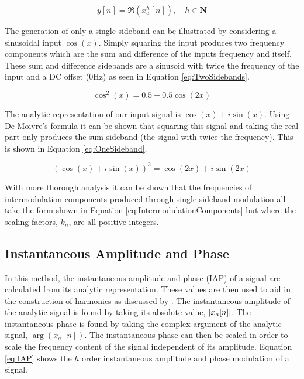 		\begin{equation}
			y[n] = \Re \left( x_{a}^{h}[n] \right), \quad h \in \textbf{N}
			\label{eq:SSB}
		\end{equation}

		The generation of only a single sideband can be illustrated by considering a sinusoidal input $\cos(x)$.
		Simply squaring the input produces two frequency components which are the sum and difference of the inputs
		frequency and itself. These sum and difference sidebands are a sinusoid with twice the frequency of the
		input and a DC offset (0Hz) as seen in Equation \ref{eq:TwoSidebands}.

		\begin{equation}
			\cos^{2}(x) = 0.5 + 0.5 \cos(2x)
			\label{eq:TwoSidebands}
		\end{equation}

		The analytic representation of our input signal is $\cos(x) + i\sin(x)$. Using De Moivre's formula it can
		be shown that squaring this signal and taking the real part only produces the sum sideband (the signal with
		twice the frequency). This is shown in Equation \ref{eq:OneSideband}.

		\begin{equation}
			\left( \cos(x) + i\sin(x) \right)^{2} = \cos(2x) + i\sin(2x)
			\label{eq:OneSideband}
		\end{equation}

		With more thorough analysis it can be shown that the frequencies of intermodulation components produced
		through single sideband modulation all take the form shown in Equation \ref{eq:IntermodulationComponents}
		but where the scaling factors, $k_{n}$, are all positive integers.

	\subsection{Instantaneous Amplitude and Phase}
	\label{sec:Excitation-Methods-IAP}
		In this method, the instantaneous amplitude and phase (IAP) of a signal are calculated from its analytic
		representation. These values are then used to aid in the construction of harmonics as discussed by
		\citet{puckette2007patch}. The instantaneous amplitude of the analytic signal is found by taking its
		absolute value, $\left|x_{a}[n]\right|$. The instantaneous phase is found by taking the complex argument of the
		analytic signal, $\arg(x_{a}[n])$. The instantaneous phase can then be scaled in order to scale the
		frequency content of the signal independent of its amplitude.  Equation \ref{eq:IAP} shows the
		$h$ order instantaneous amplitude and phase modulation of a signal.

